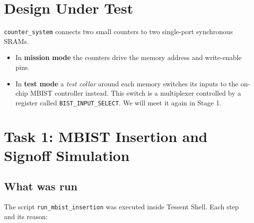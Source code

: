 \documentclass[11pt]{article}
\newcommand{\code}[1]{\texttt{\small #1}}
\begin{document}
\section{Design Under Test}

\code{counter\_system} connects two small counters to two single-port synchronous SRAMs.

\begin{center}
\end{center}

\begin{itemize}
  \item In \textbf{mission mode} the counters drive the memory address and write-enable pins.
  \item In \textbf{test mode} a \emph{test collar} around each memory switches its inputs to the on-chip MBIST controller instead.
        This switch is a multiplexer controlled by a register called \code{BIST\_INPUT\_SELECT}. We will meet it again in Stage 1.
\end{itemize}

\section{Task 1: MBIST Insertion and Signoff Simulation}

\subsection{What was run}
The script \code{run\_mbist\_insertion} was executed inside Tessent Shell. Each step and its reason:
\end{document}
